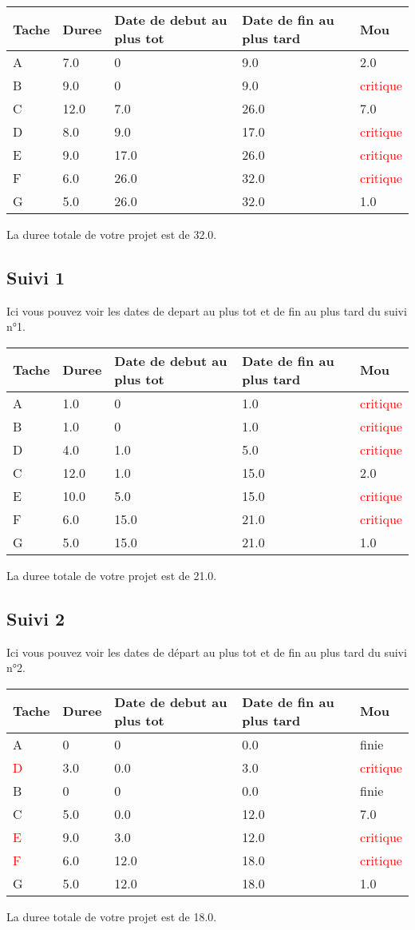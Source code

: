 \documentclass{article}
\begin{document}
\begin{tabular}{|l|l|l|l|l|}
\hline 
Tache & Duree & Date de debut au plus tot & Date de fin au plus tard & Mou\tabularnewline
\hline

A&7.0&0&9.0&2.0\tabularnewline
\hline
B&9.0&0&9.0&\textcolor{red}{critique}\tabularnewline
\hline
C&12.0&7.0&26.0&7.0\tabularnewline
\hline
D&8.0&9.0&17.0&\textcolor{red}{critique}\tabularnewline
\hline
E&9.0&17.0&26.0&\textcolor{red}{critique}\tabularnewline
\hline
F&6.0&26.0&32.0&\textcolor{red}{critique}\tabularnewline
\hline
G&5.0&26.0&32.0&1.0\tabularnewline
\hline

\end{tabular}
La duree totale de votre projet est de 32.0.

\subsection{Suivi 1}
Ici vous pouvez voir les dates de depart au plus tot et de fin au plus tard du suivi n°1.\\
\begin{tabular}{|l|l|l|l|l|}
\hline 
Tache & Duree & Date de debut au plus tot & Date de fin au plus tard & Mou\tabularnewline
\hline

A&1.0&0&1.0&\textcolor{red}{critique}\tabularnewline
\hline
B&1.0&0&1.0&\textcolor{red}{critique}\tabularnewline
\hline
D&4.0&1.0&5.0&\textcolor{red}{critique}\tabularnewline
\hline
C&12.0&1.0&15.0&2.0\tabularnewline
\hline
E&10.0&5.0&15.0&\textcolor{red}{critique}\tabularnewline
\hline
F&6.0&15.0&21.0&\textcolor{red}{critique}\tabularnewline
\hline
G&5.0&15.0&21.0&1.0\tabularnewline
\hline

\end{tabular}
La duree totale de votre projet est de 21.0.

\subsection{Suivi 2}
Ici vous pouvez voir les dates de départ au plus tot et de fin au plus tard du suivi n°2. \\
\begin{tabular}{|l|l|l|l|l|}
\hline 
Tache & Duree & Date de debut au plus tot & Date de fin au plus tard & Mou\tabularnewline
\hline

A&0 &0&0.0&finie\tabularnewline
\hline
\textcolor{red}{D}&3.0&0.0&3.0&\textcolor{red}{critique}\tabularnewline
\hline
B&0 &0&0.0&finie\tabularnewline
\hline
C&5.0&0.0&12.0&7.0\tabularnewline
\hline
\textcolor{red}{E}&9.0&3.0&12.0&\textcolor{red}{critique}\tabularnewline
\hline
\textcolor{red}{F}&6.0&12.0&18.0&\textcolor{red}{critique}\tabularnewline
\hline
G&5.0&12.0&18.0&1.0\tabularnewline
\hline

\end{tabular}
La duree totale de votre projet est de 18.0.
\end{document}
